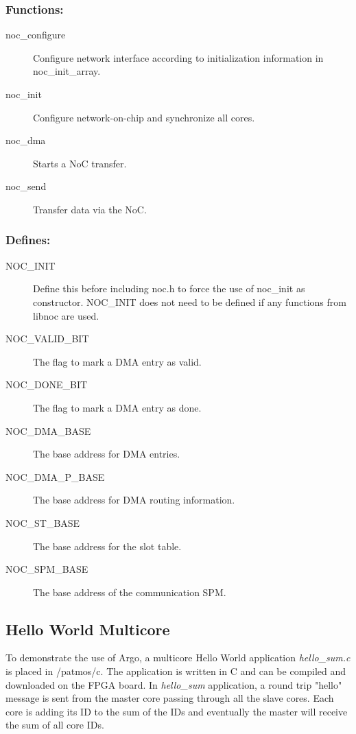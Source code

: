 \documentclass[a4paper,fontsize=10pt,twoside,DIV15,BCOR12mm,headinclude=true,footinclude=false,pagesize,bibtotoc]{scrbook}
\begin{document}
\subsubsection{Functions:}
\begin{description}
\item [noc\_configure] Configure network interface according to initialization information in noc\_init\_array.
\item [noc\_init] Configure network-on-chip and synchronize all cores. 
\item [noc\_dma] Starts a NoC transfer. 
\item [noc\_send] Transfer data via the NoC. 
\end{description}

\subsubsection{Defines:}
\begin{description}
\item [NOC\_INIT] Define this before including noc.h to force the use of noc\_init as constructor. NOC\_INIT does not need to be defined if any functions from libnoc are used.
\item [NOC\_VALID\_BIT] The flag to mark a DMA entry as valid.
\item [NOC\_DONE\_BIT] The flag to mark a DMA entry as done.
\item [NOC\_DMA\_BASE] The base address for DMA entries.
\item [NOC\_DMA\_P\_BASE] The base address for DMA routing information.
\item [NOC\_ST\_BASE] The base address for the slot table.
\item [NOC\_SPM\_BASE] The base address of the communication SPM.
\end{description}

\subsection{Hello World Multicore}

To demonstrate the use of Argo, a multicore Hello World application \textit{hello\_sum.c} is placed in /patmos/c.
The application is written in C and can be compiled and downloaded on the FPGA board.
In \textit{hello\_sum} application, a round trip "hello" message is sent from the master core
passing through all the slave cores. Each core is adding its ID to the sum of the IDs and 
eventually the master will receive the sum of all core IDs.
\end{document}
